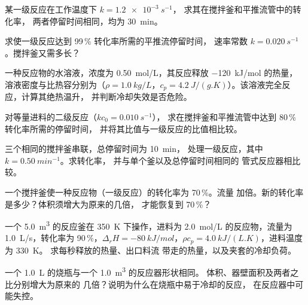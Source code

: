 \begin{exercise}[$\star$]\label{exo:b2:continuous-reactors:2}
某一级反应在工作温度下 $k = \qty{1.2e-3}{s^{-1}}$，
求其在搅拌釜和平推流管中的转化率，
两者停留时间相同，均为 \qty{30}{min}。
\end{exercise}

\begin{exercise}[$\star$]\label{exo:b2:continuous-reactors:3}
求使一级反应达到 99\,\% 转化率所需的平推流停留时间，
速率常数 $k = \qty{0.020}{s^{-1}}$。搅拌釜又需多长？
\end{exercise}

\begin{exercise}[$\star$]\label{exo:b2:continuous-reactors:4}
一种反应物的水溶液，浓度为 \qty{0.50}{mol/L}，其反应释放 \qty{-120}{kJ/mol} 的热量，
溶液密度与比热容分别为（$\rho = \qty{1.0}{kg/L}$，$c_p =
\qty{4.2}{J/(g.K)}$）。该溶液完全反应，计算其绝热温升，
并判断冷却失效是否危险。
\end{exercise}

\begin{exercise}[$\star\star$]\label{exo:b2:continuous-reactors:5}
对等量进料的二级反应（$kc_0 = \qty{0.010}{s^{-1}}$），
求在搅拌釜和平推流管中达到 80\,\% 转化率所需的停留时间，
并将其比值与一级反应的比值相比较。
\end{exercise}

\begin{exercise}[$\star\star$]\label{exo:b2:continuous-reactors:6}
三个相同的搅拌釜串联，总停留时间为 \qty{10}{min}，
处理一级反应，其中 $k = \qty{0.50}{min^{-1}}$。求转化率，
并与单个釜以及总停留时间相同的
管式反应器相比较。
\end{exercise}

\begin{exercise}[$\star\star$]\label{exo:b2:continuous-reactors:7}
一个搅拌釜使一种反应物（一级反应）的转化率为 70\,\%。流量
加倍。新的转化率是多少？体积须增大为原来的几倍，
才能恢复到 70\,\%？
\end{exercise}

\begin{exercise}[$\star\star$]\label{exo:b2:continuous-reactors:8}
一个 \qty{5.0}{m^3} 的反应釜在 \qty{350}{K} 下操作，进料为
\qty{2.0}{mol/L} 的反应物，流量为 \qty{1.0}{L/s}，转化率为 90\,\%，$\Delta_r H
= \qty{-80}{kJ/mol}$，$\rho c_p = \qty{4.0}{kJ/(L.K)}$，进料温度为 \qty{330}{K}。
求每秒释放的热量、出口料流
带走的热量，以及夹套的冷却负荷。
\end{exercise}

\begin{exercise}[$\star\star$]\label{exo:b2:continuous-reactors:9}
一个 \qty{1.0}{L} 的烧瓶与一个 \qty{1.0}{m^3} 的反应器形状相同。
体积、器壁面积及两者之比分别增大为原来的
几倍？说明为什么在烧瓶中易于冷却的反应，
在反应器中可能失控。
\end{exercise}

